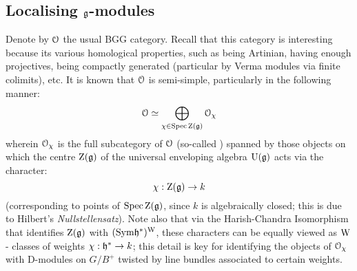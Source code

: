     \subsection{Localising \texorpdfstring{$\mathfrak{g}$}{}-modules}
        Denote by $\mathcal{O}$ the usual BGG category. Recall that this category is interesting because its various homological properties, such as being Artinian, having enough projectives, being compactly generated (particular by Verma modules via finite colimits), etc. It is known that $\mathcal{O}$ is semi-simple, particularly in the following manner:
            $$\mathcal{O} \simeq \bigoplus_{\chi \in \operatorname{Spec} \mathrm{Z}(\mathfrak{g})} \mathcal{O}_{\chi}$$
        wherein $\mathcal{O}_{\chi}$ is the full subcategory of $\mathcal{O}$ (so-called ) spanned by those objects on which the centre $\mathrm{Z}(\mathfrak{g})$ of the universal enveloping algebra $\mathrm{U}(\mathfrak{g})$ acts via the character:
            $$\chi: \mathrm{Z}(\mathfrak{g}) \to k$$
        (corresponding to points of $\operatorname{Spec} \mathrm{Z}(\mathfrak{g})$, since $k$ is algebraically closed; this is due to Hilbert's \textit{Nullstellensatz}). Note also that via the Harish-Chandra Isomorphism that identifies $\mathrm{Z}(\mathfrak{g})$ with $(\mathrm{Sym} \mathfrak{h}^*)^{\mathrm{W}}$, these characters can be equally viewed as $\mathrm{W}$- classes of weights $\chi: \mathfrak{h}^* \to k$; this detail is key for identifying the objects of $\mathcal{O}_{\chi}$ with D-modules on $G/B^+$ twisted by line bundles associated to certain weights. 